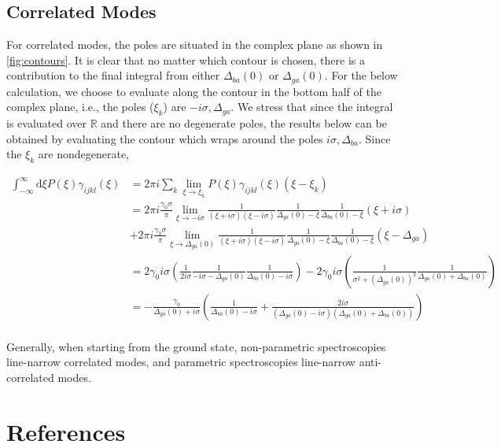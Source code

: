 \documentclass[aip, jcp, reprint, onecolumn, nofootinbib]{revtex4-2}
\begin{document}
\subsection{Correlated Modes}
For correlated modes, the poles are situated in the complex plane as shown in \autoref{fig:contours}.
It is clear that no matter which contour is chosen, there is a contribution to the final integral from either $\Delta_{ba}(0)$ or $\Delta_{ga}(0)$. 
For the below calculation, we choose to evaluate along the contour in the bottom half of the complex plane, i.e., the poles ($\xi_k$) are $-i\sigma, \Delta_{ga}$.
We stress that since the integral is evaluated over $\mathbb{R}$ and there are no degenerate poles, the results below can be obtained by evaluating the contour which wraps around the poles $i\sigma, \Delta_{ba}$. 
Since the $\xi_k$ are nondegenerate,
\begin{widetext}
	\begin{equation}
		\begin{split}
			\int_{-\infty}^\infty \mathrm{d}\xi P(\xi) \gamma_{ijkl}(\xi) &= 2\pi i \sum_k \lim_{\xi \rightarrow \xi_k} P(\xi) \gamma_{ijkl}(\xi) (\xi - \xi_k)\\
			&= 2\pi i \frac{\gamma_0 \sigma}{\pi}  \lim_{\xi \rightarrow -i\sigma} \frac{1}{(\xi + i\sigma)(\xi - i\sigma)} \frac{1}{\Delta_{ga}(0) - \xi} \frac{1}{\Delta_{ba}(0) - \xi} (\xi + i \sigma) \\ 
			&+ 2\pi i \frac{\gamma_0 \sigma}{\pi} \lim_{\xi \rightarrow \Delta_{ga}(0)} \frac{1}{(\xi + i\sigma)(\xi - i\sigma)} \frac{1}{\Delta_{ga}(0) - \xi} \frac{1}{\Delta_{ba}(0) - \xi} (\xi - \Delta_{ga})\\
			&= 2 \gamma_0 i \sigma (\frac{1}{2 i \sigma} \frac{1}{-i \sigma - \Delta_{ga}(0)} \frac{1}{\Delta_{ba}(0) - i\sigma} ) - 2 \gamma_0 i \sigma (\frac{1}{\sigma^2 + (\Delta_{ga} (0))^2} \frac{1}{\Delta_{ga}(0) + \Delta_{ba}(0)} )\\
			&= -\frac{\gamma_0}{\Delta_{ga}(0) + i \sigma} (\frac{1}{\Delta_{ba}(0) - i \sigma} + \frac{2i\sigma}{(\Delta_{ga}(0) - i \sigma)(\Delta_{ga}(0) + \Delta_{ba}(0))})\\
		\end{split}
	\end{equation}
\end{widetext}
Generally, when starting from the ground state, non-parametric spectroscopies line-narrow correlated modes, and parametric spectroscopies line-narrow anti-correlated modes. \cite{Dick83_1, RN425}




\section{References}

\end{document}
